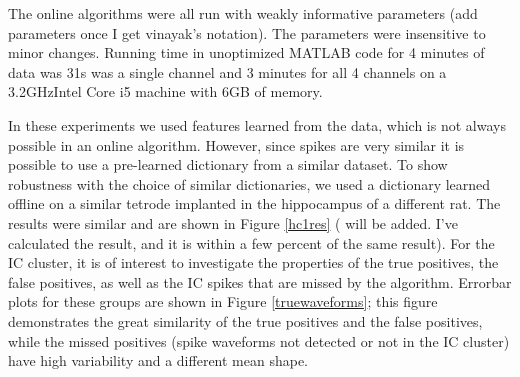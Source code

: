 The online algorithms were all run with weakly informative parameters (add parameters once I get vinayak's notation). The parameters were insensitive to minor changes.  Running time in unoptimized MATLAB code for 4 minutes of data was 31s was a single channel and 3 minutes for all 4 channels on a 3.2GHzIntel Core i5 machine with 6GB of memory.

In these experiments we used features learned from the data, which is not always possible in an online algorithm.  However, since spikes are very similar it is possible to use a pre-learned dictionary from a similar dataset.  To show robustness with the choice of similar dictionaries, we used a dictionary learned offline on a similar tetrode implanted in the hippocampus of a different rat.  The results were similar and are shown in Figure \ref{hc1res} ({\color{red} will be added.  I've calculated the result, and it is within a few percent of the same result}).  For the IC cluster, it is of interest to investigate the properties of the true positives, the false positives, as well as the IC spikes that are missed by the algorithm.  Errorbar plots for these groups are shown in Figure \ref{truewaveforms}; this figure demonstrates the great similarity of the true positives and the false positives, while the missed positives (spike waveforms not detected or not in the IC cluster) have high variability and a different mean shape.
